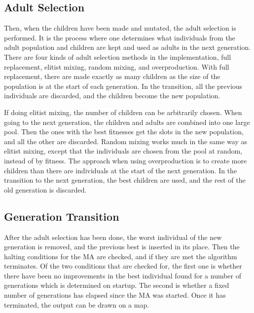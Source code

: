 \subsection{Adult Selection} %
\label{sub:achitecture_adult_selection}

Then, when the children have been made and mutated, the adult selection is performed. It is the process where one determines what individuals from the adult population and children are kept and used as adults in the next generation. There are four kinds of adult selection methods in the implementation, full replacement, elitist mixing, random mixing, and overproduction. With full replacement, there are made exactly as many children as the size of the population is at the start of each generation. In the transition, all the previous individuals are discarded, and the children become the new population.

If doing elitist mixing, the number of children can be arbitrarily chosen. When going to the next generation, the children and adults are combined into one large pool. Then the ones with the best fitnesses get the slots in the new population, and all the other are discarded. Random mixing works much in the same way as elitist mixing, except that the individuals are chosen from the pool at random, instead of by fitness. The approach when using overproduction is to create more children than there are individuals at the start of the next generation. In the transition to the next generation, the best children are used, and the rest of the old generation is discarded.


\subsection{Generation Transition} %
\label{sub:achitecture_generation_transition}


After the adult selection has been done, the worst individual of the new generation is removed, and the previous best is inserted in its place. Then the halting conditions for the MA are checked, and if they are met the algorithm terminates. Of the two conditions that are checked for, the first one is whether there have been no improvements in the best individual found for a number of generations which is determined on startup. The second is whether a fixed number of generations has elapsed since the MA was started. Once it has terminated, the output can be drawn on a map.


\cleardoublepage
